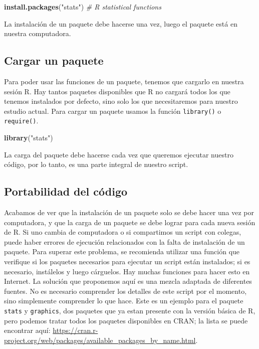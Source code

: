 \documentclass[
]{book}
\newenvironment{Shaded}{\begin{snugshade}}{\end{snugshade}}
\newcommand{\CommentTok}[1]{\textcolor[rgb]{0.56,0.35,0.01}{\textit{#1}}}
\newcommand{\KeywordTok}[1]{\textcolor[rgb]{0.13,0.29,0.53}{\textbf{#1}}}
\newcommand{\NormalTok}[1]{#1}
\newcommand{\StringTok}[1]{\textcolor[rgb]{0.31,0.60,0.02}{#1}}
\begin{document}
\begin{Shaded}
\begin{Highlighting}[]
\KeywordTok{install.packages}\NormalTok{(}\StringTok{"stats"}\NormalTok{) }\CommentTok{# R statistical functions}
\end{Highlighting}
\end{Shaded}

La instalación de un paquete debe hacerse una vez, luego el paquete está en nuestra computadora.

\hypertarget{cargar-un-paquete}{%
\subsection{Cargar un paquete}\label{cargar-un-paquete}}

Para poder usar las funciones de un paquete, tenemos que cargarlo en nuestra sesión R. Hay tantos paquetes disponibles que R no cargará todos los que tenemos instalados por defecto, sino solo los que necesitaremos para nuestro estudio actual. Para cargar un paquete usamos la función \texttt{library()} o \texttt{require()}.

\begin{Shaded}
\begin{Highlighting}[]
\KeywordTok{library}\NormalTok{(}\StringTok{"stats"}\NormalTok{)}
\end{Highlighting}
\end{Shaded}

La carga del paquete debe hacerse cada vez que queremos ejecutar nuestro código, por lo tanto, es una parte integral de nuestro script.

\hypertarget{portabilidad-del-cuxf3digo}{%
\subsection{Portabilidad del código}\label{portabilidad-del-cuxf3digo}}

Acabamos de ver que la instalación de un paquete solo se debe hacer una vez por computadora, y que la carga de un paquete se debe lograr para cada nueva sesión de R. Si uno cambia de computadora o si compartimos un script con colegas, puede haber errores de ejecución relacionados con la falta de instalación de un paquete. Para superar este problema, se recomienda utilizar una función que verifique si los paquetes necesarios para ejecutar un script están instalados; si es necesario, instálelos y luego cárguelos. Hay muchas funciones para hacer esto en Internet. La solución que proponemos aquí es una mezcla adaptada de diferentes fuentes. No es necesario comprender los detalles de este script por el momento, sino simplemente comprender lo que hace. Este es un ejemplo para el paquete \texttt{stats} y \texttt{graphics}, dos paquetes que ya estan presente con la versión básica de R, pero podemos tratar todos los paquetes disponibles en CRAN; la lista se puede encontrar aquí: \url{https://cran.r-project.org/web/packages/available_packages_by_name.html}.
\end{document}
